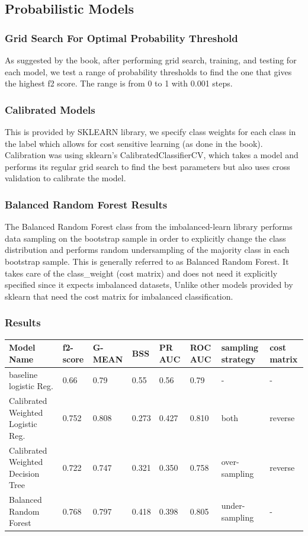 \documentclass{article}
\begin{document}
\subsection{Probabilistic Models}
\subsubsection{Grid Search For Optimal Probability Threshold}
As suggested by the book, after performing grid search, training, and testing for each model, we test a range of probability thresholds to find the one that gives the highest f2 score. The range is from 0 to 1 with 0.001 steps.

\subsubsection{Calibrated Models}
This is provided by SKLEARN library, we specify class weights for each class in the label which allows for cost sensitive learning (as done in the book). Calibration was using sklearn's CalibratedClassifierCV, which takes a model and performs its regular grid search to find the best parameters but also uses cross validation to calibrate the model.

\subsubsection{Balanced Random Forest Results}
The Balanced Random Forest class from the imbalanced-learn library performs data sampling on the bootstrap sample
in order to explicitly change the class distribution and performs random undersampling of the majority class in each bootstrap sample. This is generally referred to as Balanced Random
Forest. It takes care of the class\_weight (cost matrix) and does not need it explicitly specified since it expects imbalanced datasets, Unlike other models provided by sklearn that need the cost matrix for imbalanced classification.

\subsubsection{Results}
\begin{tabular}{ |p{2cm}|p{1cm}|p{1cm}|p{1cm}|p{1cm}|p{1cm}|p{2cm}|p{2cm}|} 
 \hline
 Model Name&f2-score&G-MEAN&BSS&PR AUC&ROC AUC&sampling strategy& cost matrix\\ 
 \hline
baseline logistic Reg. &0.66&0.79&0.55&0.56&0.79&-&-\\
 \hline
Calibrated Weighted Logistic Reg. &0.752 &0.808 &0.273 &0.427 &0.810 &both& reverse\\
 \hline
Calibrated Weighted Decision Tree  &0.722 &0.747 &0.321 &0.350 &0.758 &over-sampling&reverse\\
 \hline
Balanced Random Forest &0.768 &0.797 &0.418 &0.398 &0.805 &under-sampling&-\\
 \hline
\end{tabular}
\end{document}
